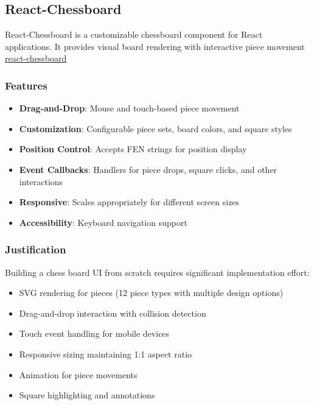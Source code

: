 \subsection*{React-Chessboard}

React-Chessboard is a customizable chessboard component for React applications. It provides visual board rendering with interactive piece movement \href{https://www.npmjs.com/package/react-chessboard}{react-chessboard}

\subsubsection*{Features}

\begin{itemize}
    \item \textbf{Drag-and-Drop}: Mouse and touch-based piece movement
    \item \textbf{Customization}: Configurable piece sets, board colors, and square styles
    \item \textbf{Position Control}: Accepts FEN strings for position display
    \item \textbf{Event Callbacks}: Handlers for piece drops, square clicks, and other interactions
    \item \textbf{Responsive}: Scales appropriately for different screen sizes
    \item \textbf{Accessibility}: Keyboard navigation support
\end{itemize}

\subsubsection*{Justification}

Building a chess board UI from scratch requires significant implementation effort:
\begin{itemize}
    \item SVG rendering for pieces (12 piece types with multiple design options)
    \item Drag-and-drop interaction with collision detection
    \item Touch event handling for mobile devices
    \item Responsive sizing maintaining 1:1 aspect ratio
    \item Animation for piece movements
    \item Square highlighting and annotations
\end{itemize}

